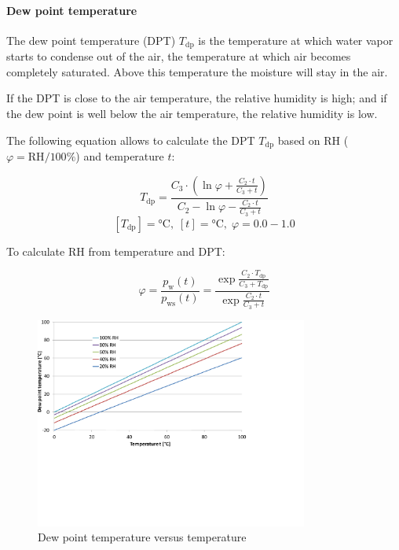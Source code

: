\documentclass[11pt,a4paper,english,twoside]{scrreprt}
\begin{document}
\paragraph{Dew point temperature}

The dew point temperature (DPT) $T_\text{dp}$ is the temperature at which water vapor starts to condense out of the air, the temperature at which air becomes completely saturated. Above this temperature the moisture will stay in the air.

If the DPT is close to the air temperature, the relative humidity is high; and if the dew point is well below the air temperature, the relative humidity is low.

The following equation allows to calculate the DPT $T_\text{dp}$ based on RH ($\varphi = \text{RH}/100\%$) and temperature $t$:


\[T_\text{dp} =\frac{C_3 \cdot \left(\ln \varphi +\frac{C_2 \cdot t}{C_3 + t} \right)}{C_2 -\ln \varphi -\frac{C_2 \cdot t}{C_3 + t} } \]
\[[T_\text{dp}] = \si{\degreeCelsius},\; [t] = \si{\degreeCelsius},\; \varphi = \num{0.0} - \num{1.0}\]


To calculate RH from temperature and DPT:

\[
\varphi =\frac{p_\text{w}(t)}{p_\text{ws}(t)} =\frac{\exp \frac{C_2 \cdot T_\text{dp}}{C_3 +T_\text{dp}}}{\exp \frac{C_2 \cdot t}{C_3 +t}} 
\]

\begin{figure}
  \centering
  \includegraphics*[width=0.8\textwidth,angle=0]{FCF_Diag_DPT.pdf}
  \caption[Dew point temperature versus temperature]{Dew point temperature versus temperature}
\end{figure}
\end{document}
